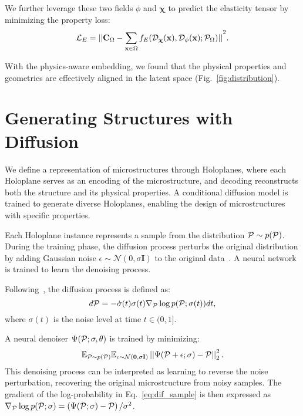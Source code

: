 We further leverage these two fields $\phi$ and $\boldsymbol{\chi}$ to predict the elasticity tensor by minimizing the property loss:
\begin{equation}
    \mathcal{L}_{E}={||\mathbf{C}_\Omega - \sum_{\mathbf{x} \in \Omega}f_{E}(\mathcal{D}_{\boldsymbol{\chi}}(\mathbf{x}), \mathcal{D}_\phi(\mathbf{x}); \mathcal{P}_\Omega)||}^2.
\end{equation}


With the physics-aware embedding, we found that the physical properties and geometries are effectively aligned in the latent space (Fig.~\ref{fig:distribution}). 


\section{Generating Structures with Diffusion}
\label{sec:diffusion}

We define a representation of microstructures through Holoplanes, where each Holoplane serves as an encoding of the microstructure, and decoding reconstructs both the structure and its physical properties. 
A conditional diffusion model is trained to generate diverse Holoplanes, enabling the design of microstructures with specific properties.

Each Holoplane instance represents a sample from the distribution $\mathcal{P} \sim p(\mathcal{P})$.
During the training phase, the diffusion process perturbs the original distribution by adding Gaussian noise $\epsilon \sim \mathcal{N}(0, \sigma \mathbf{I})$ to the original data~\cite{Ho2020DDPM}.
A neural network is trained to learn the denoising process.

Following~\cite{song2021scorebased, karras2022edm}, the diffusion process is defined as:
\begin{equation}
\label{eq:dif_sample}
    d\mathcal{P}=-\dot{\sigma}(t)\sigma(t)\nabla_{\mathcal{P}}\log{p(\mathcal{P};\sigma(t))}dt,
\end{equation}
where $\sigma(t)$ is the noise level at time $t \in (0, 1]$.

A neural denoiser $\Psi(\mathcal{P};\sigma, \theta)$ is trained by minimizing:
\begin{equation}
\label{eq:dif_train}
    \mathbb{E}_{\mathcal{P}\sim p(\mathcal{P})}\mathbb{E}_{\mathbf{\epsilon \sim \mathcal{N}(0, \sigma \mathbf{I})}} \left|\left| \Psi(\mathcal{P} + \epsilon; \sigma) - \mathcal{P}\right|\right|_2^2.
\end{equation}
This denoising process can be interpreted as learning to reverse the noise perturbation, recovering the original microstructure from noisy samples. 
The gradient of the log-probability in Eq.~\ref{eq:dif_sample} is then expressed as $\nabla_{\mathcal{P}}\log{p(\mathcal{P};\sigma)}=\left(\Psi(\mathcal{P}; \sigma) - \mathcal{P}\right) / \sigma^2$.


